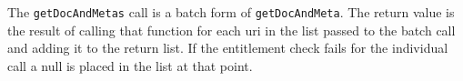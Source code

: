 The \verb+getDocAndMetas+ call is a batch form of \verb+getDocAndMeta+. The return
value is the result of calling that function for each uri in the list passed to
the batch call and adding it to the return list. If the entitlement check fails
for the individual call a null is placed in the list at that point.
